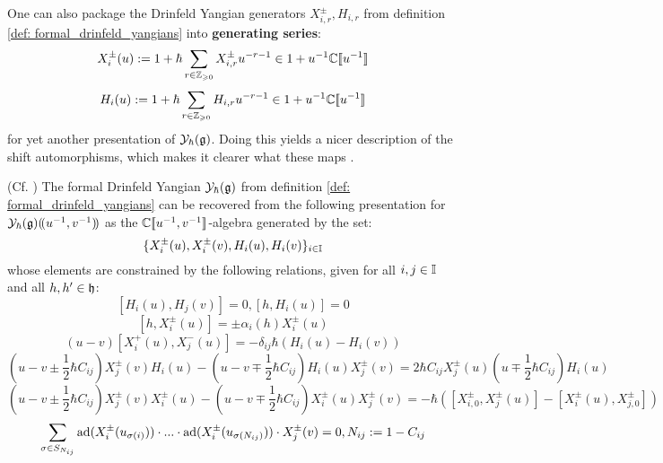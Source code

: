         One can also package the Drinfeld Yangian generators $X_{i, r}^{\pm}, H_{i, r}$ from definition \ref{def: formal_drinfeld_yangians} into \textbf{generating  series}:
            $$X_i^{\pm}(u) := 1 + \hbar \sum_{r \in \mathbb{Z}_{\geqslant 0}} X_{i, r}^{\pm} u^{-r - 1} \in 1 + u^{-1} \mathbb{C}[\![u^{-1}]\!]$$
            $$H_i(u) := 1 + \hbar \sum_{r \in \mathbb{Z}_{\geqslant 0}} H_{i, r} u^{-r - 1} \in 1 + u^{-1} \mathbb{C}[\![u^{-1}]\!]$$
        for yet another presentation of $\mathcal{Y}_{\hbar}(\mathfrak{g})$. Doing this yields a nicer description of the shift automorphisms, which makes it clearer what these maps . 
        \begin{proposition} \label{prop: generating_series_for_finite_untwisted_yangians}
            (Cf. \cite[Proposition 2.3]{gautam_and_toledano_laredo_yangians_quantum_loop_algebras_and_abelian_difference_equations}) The formal Drinfeld Yangian $\mathcal{Y}_{\hbar}(\mathfrak{g})$ from definition \ref{def: formal_drinfeld_yangians} can be recovered from the following presentation for $\mathcal{Y}_{\hbar}(\mathfrak{g})(\!(u^{-1}, v^{-1})\!)$ as the $\mathbb{C}[\![u^{-1}, v^{-1}]\!]$-algebra generated by the set:
                $$\{X_i^{\pm}(u), X_i^{\pm}(v), H_i(u), H_i(v)\}_{i \in \mathbb{I}}$$
            whose elements are constrained by the following relations, given for all $i, j \in \mathbb{I}$ and all $h, h' \in \mathfrak{h}$:
                $$[H_i(u), H_j(v)] = 0, [h, H_i(u)] = 0$$
                $$[h, X_i^{\pm}(u)] = \pm \alpha_i(h) X_i^{\pm}(u)$$
                $$(u - v) [X_i^+(u), X_j^-(u)] = -\delta_{ij} \hbar ( H_i(u) - H_i(v) )$$
                $$\left(u - v \pm \frac12 \hbar C_{ij}\right) X_j^{\pm}(v) H_i(u) - \left(u - v \mp  \frac12 \hbar C_{ij}\right) H_i(u) X_j^{\pm}(v) = 2 \hbar C_{ij} X_j^{\pm}(u) \left(u \mp \frac12 \hbar C_{ij}\right) H_i(u)$$
                $$\left(u - v \pm \frac12 \hbar C_{ij}\right) X_j^{\pm}(v) X_i^{\pm}(u) - \left(u - v \mp \frac12 \hbar C_{ij}\right) X_i^{\pm}(u) X_j^{\pm}(v) = -\hbar( [X_{i, 0}^{\pm}, X_j^{\pm}(u)] - [X_i^{\pm}(u), X_{j, 0}^{\pm}] )$$
                $$\sum_{\sigma \in S_{N_{ij}}} \mathrm{ad}( X_i^{\pm}( u_{\sigma(i)} ) ) \cdot ... \cdot \mathrm{ad}( X_i^{\pm}( u_{\sigma(N_{ij})} ) ) \cdot X_j^{\pm}(v) = 0, N_{ij} := 1 - C_{ij}$$
        \end{proposition}
